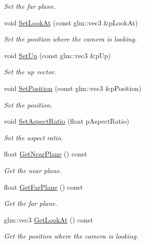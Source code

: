 \begin{DoxyCompactItemize}
\begin{DoxyCompactList}\small\item\em Set the far plane. \end{DoxyCompactList}\item 
void \hyperlink{class_camera_a9f3221469594ce31bdf3ee673577a2b6}{Set\+Look\+At} (const glm\+::vec3 \&p\+Look\+At)
\begin{DoxyCompactList}\small\item\em Set the position where the camera is looking. \end{DoxyCompactList}\item 
void \hyperlink{class_camera_a39d0f3ca769adbe802cb7f1493940d23}{Set\+Up} (const glm\+::vec3 \&p\+Up)
\begin{DoxyCompactList}\small\item\em Set the up vector. \end{DoxyCompactList}\item 
void \hyperlink{class_camera_a875d3ad0e688f04de334f3f3259151bd}{Set\+Position} (const glm\+::vec3 \&p\+Position)
\begin{DoxyCompactList}\small\item\em Set the position. \end{DoxyCompactList}\item 
void \hyperlink{class_camera_a47dcbda753a11b7af9f8497cbb3dd637}{Set\+Aspect\+Ratio} (float p\+Aspect\+Ratio)
\begin{DoxyCompactList}\small\item\em Set the aspect ratio. \end{DoxyCompactList}\item 
float \hyperlink{class_camera_adc1859643780c47416ef26807be03d16}{Get\+Near\+Plane} () const 
\begin{DoxyCompactList}\small\item\em Get the near plane. \end{DoxyCompactList}\item 
float \hyperlink{class_camera_a9adbe451cc3a502e6a6fe6b396a2740d}{Get\+Far\+Plane} () const 
\begin{DoxyCompactList}\small\item\em Get the far plane. \end{DoxyCompactList}\item 
glm\+::vec3 \hyperlink{class_camera_acb96479e814b3176a6062c1447167872}{Get\+Look\+At} () const 
\begin{DoxyCompactList}\small\item\em Get the position where the camera is looking. \end{DoxyCompactList}\item 

\end{DoxyCompactItemize}
